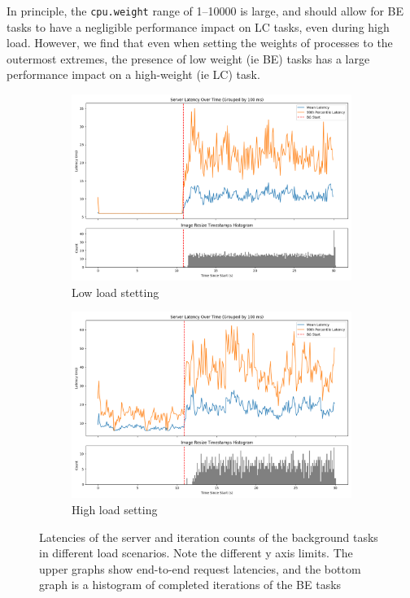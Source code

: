 In principle, the \texttt{cpu.weight} range of 1--10000 is large, and should
allow for BE tasks to have a negligible performance impact on LC tasks, even
during high load. However, we find that even when setting the weights of
processes to the outermost extremes, the presence of low weight (ie BE) tasks
has a large performance impact on a high-weight (ie LC) task.


\begin{figure}[t]
    \centering
    \begin{subfigure}[t]{0.48\textwidth}
        \includegraphics[width=\textwidth]{graphs/unedited-weight-low-two.png}
        \caption{Low load stetting}\label{fig:unedited-weight-low-two}
    \end{subfigure}
    \hspace{\fill}
    \begin{subfigure}[t]{0.48\textwidth}
        \includegraphics[width=\textwidth]{graphs/unedited-weight-high-two.png}
        \caption{High load setting}\label{fig:unedited-weight-high-two}
    \end{subfigure}
    \caption{Latencies of the server and iteration counts of the background
    tasks in different load scenarios. Note the different y axis limits. The
    upper graphs show end-to-end request latencies, and the bottom graph is a
    histogram of completed iterations of the BE tasks}
\end{figure}

